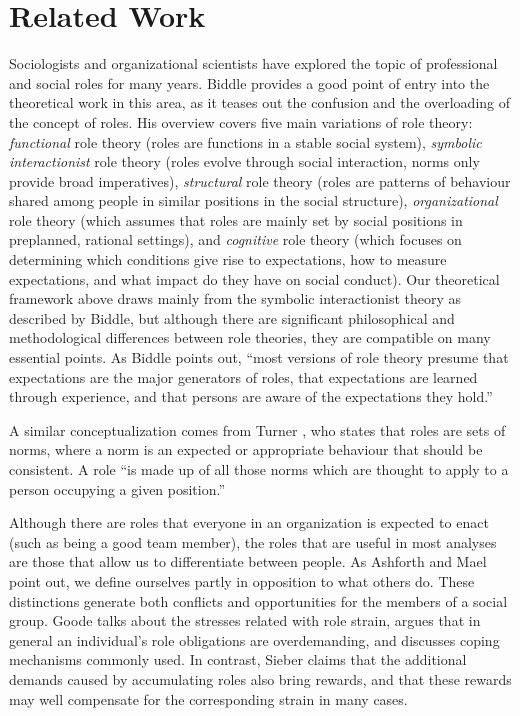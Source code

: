 \documentclass[10pt, conference, compsocconf]{IEEEtran}
\begin{document}

\section{Related Work}

Sociologists and organizational scientists have explored the topic of professional and social roles for many years. Biddle \cite{Biddle1986} provides a good point of entry into the theoretical work in this area, as it teases out the confusion and the overloading of the concept of roles. His overview covers five main variations of role theory: \emph{functional} role theory (roles are functions in a stable social system), \emph{symbolic interactionist} role theory (roles evolve through social interaction, norms only provide broad imperatives), \emph{structural} role theory (roles are patterns of behaviour shared among people in similar positions in the social structure), \emph{organizational} role theory (which assumes that roles are mainly set by social positions in preplanned, rational settings), and \emph{cognitive} role theory (which focuses on determining which conditions give rise to expectations, how to measure expectations, and what impact do they have on social conduct). Our theoretical framework above draws mainly from the symbolic interactionist theory as described by Biddle, but although there are significant philosophical and methodological differences between role theories, they are compatible on many essential points. As Biddle points out, ``most versions of role theory presume that expectations are the major generators of roles, that expectations are learned through experience, and that persons are aware of the expectations they hold.''

A similar conceptualization comes from Turner \cite{Turner1956}, who states that roles are sets of norms, where a norm is an expected or appropriate behaviour that should be consistent. A role ``is made up of all those norms which are thought to apply to a person occupying a given position.''

Although there are roles that everyone in an organization is expected to enact (such as being a good team member), the roles that are useful in most analyses are those that allow us to differentiate between people. As Ashforth and Mael \cite{Ashforth1989} point out, we define ourselves partly in opposition to what others do. These distinctions generate both conflicts and opportunities for the members of a social group. Goode \cite{Goode1960} talks about the stresses related with role strain, argues that in general an individual's role obligations are overdemanding, and discusses coping mechanisms commonly used. In contrast, Sieber \cite{Sieber1974} claims that the additional demands caused by accumulating roles also bring rewards, and that these rewards may well compensate for the corresponding strain in many cases. 
\end{document}
